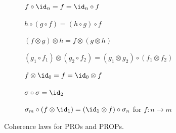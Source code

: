 \captionsetup[subfigure]{justification=centering}
\begin{figure}[ht]
  \centering
  \begin{subfigure}[t]{0.43\textwidth}
    \centering
    \caption{\(f\circ\id_n = f = \id_n\circ f\)}
    \label{eq:seqidentity}
  \end{subfigure}%
  \begin{subfigure}[t]{0.43\textwidth}
    \centering
    \caption{\(h\circ(g\circ f) = (h\circ g)\circ f\)}
    \label{eq:seqassociativity}
  \end{subfigure}
  \begin{subfigure}[t]{0.30\textwidth}
    \centering
    \caption{\((f\!\otimes\! g)\!\otimes\! h \!=\! f\!\otimes\!(g\!\otimes\! h)\)}
    \label{eq:parassociativity}
  \end{subfigure}%
  \begin{subfigure}[t]{0.45\textwidth}
    \centering
    \caption{\((g_1\!\circ\! f_1)\!\otimes\!(g_2\!\circ\! f_2)
         \!=\! (g_1\!\otimes\! g_2)\!\circ\!(f_1\!\otimes\! f_2)\)}
    \label{eq:interchange}
  \end{subfigure}
  
  \vspace{1ex}

  \begin{subfigure}[t]{0.38\textwidth}
    \centering
    \caption{\(f \otimes \id_0 = f = \id_0 \otimes f\)}
    \label{eq:paridentity}
  \end{subfigure}%
  \begin{subfigure}[t]{0.26\textwidth}
    \centering
    \caption{\(\sigma\circ\sigma = \id_2\)}
    \label{eq:involution}
  \end{subfigure}%
  \begin{subfigure}[t]{0.35\textwidth}
    \centering
    \caption{\(\sigma_m\circ(f\otimes\id_1) = (\id_1\otimes f)\circ\sigma_n\) for \(f:n\to m\)}
    \label{eq:naturality}
  \end{subfigure}
  \caption{Coherence laws for PROs and PROPs.}
  \label{fig:coherenceprop}
\end{figure}

